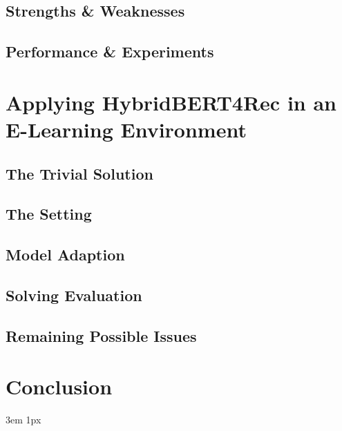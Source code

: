 \documentclass{Academic}
\begin{document}
        \subsection{Strengths \& Weaknesses}

        \subsection{Performance \& Experiments}

    \section{Applying HybridBERT4Rec in an E-Learning Environment}

        \subsection{The Trivial Solution}
    
        \subsection{The Setting}

        \subsection{Model Adaption}

        \subsection{Solving Evaluation}

        \subsection{Remaining Possible Issues}
    
    \section{Conclusion}

    \singlespacing
    \emergencystretch 3em
    \hfuzz 1px
    \printbibliography[heading=bibnumbered]




\end{document}
